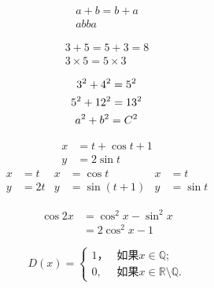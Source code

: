 \documentclass{ctexart}%
\begin{document}
	\begin{gather}
		a+b=b+a\\
		ab ba
	\end{gather}
	
	\begin{gather*}
		3+5=5+3=8 \\
		3\times5=5\times 3
	\end{gather*}
	
	\begin{gather}
		3^2 + 4^2 = 5^2 \notag \\
		5^2 + 12^2 = 13^2 \notag \\
		a^2+b^2=C^2
	\end{gather}
	
	\begin{align}
		x &=t+ \cos t+1\\
		y &= 2\sin t
	\end{align}
	\begin{align*}
		x &=t&x &=\cos t&x&=t\\
		y&=2t&y&=\sin(t+1)&y&=\sin t
	\end{align*}
	
	
	\begin{equation}
		\begin{split}
			\cos 2x &= \cos^2 x - \sin^2 x \\
			&= 2\cos^2 x - 1
		\end{split}
	\end{equation}
	
	\begin{equation}
		D(x)= \begin{cases}
			1，& \text{如果} x \in \mathbb{Q}; \\
			0, & \text{如果} x \in \mathbb{R}\setminus\mathbb{Q}. 
		\end{cases}
	\end{equation}
	
\end{document}
